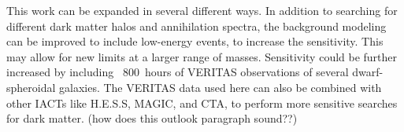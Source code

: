This work can be expanded in several different ways.
In addition to searching for different dark matter halos and annihilation spectra, the background modeling can be improved to include low-energy events, to increase the sensitivity.
This may allow for new limits at a larger range of masses.
Sensitivity could be further increased by including ~\SI{800}{hours} of VERITAS observations of several dwarf-spheroidal galaxies.
The VERITAS data used here can also be combined with other IACTs like H.E.S.S, MAGIC, and CTA, to perform more sensitive searches for dark matter.
{\color{red}(how does this outlook paragraph sound??)}


